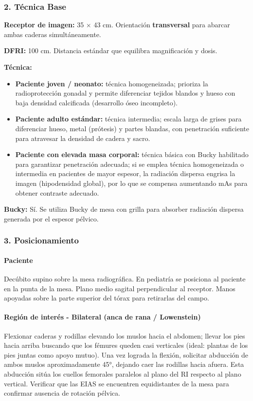 	\subsubsection*{2. Técnica Base}
	
	\textbf{Receptor de imagen:} 35 $\times$ 43 cm. Orientación \textbf{transversal} para abarcar ambas caderas simultáneamente.
	
	\textbf{DFRI:} 100 cm. Distancia estándar que equilibra magnificación y dosis.
	
	\textbf{Técnica:}
	\begin{itemize}
		\item \textbf{Paciente joven / neonato:} técnica homogeneizada; prioriza la radioprotección gonadal y permite diferenciar tejidos blandos y hueso con baja densidad calcificada (desarrollo óseo incompleto).
		\item \textbf{Paciente adulto estándar:} técnica intermedia; escala larga de grises para diferenciar hueso, metal (prótesis) y partes blandas, con penetración suficiente para atravesar la densidad de cadera y sacro.
		\item \textbf{Paciente con elevada masa corporal:} técnica básica con Bucky habilitado para garantizar penetración adecuada; si se emplea técnica homogeneizada o intermedia en pacientes de mayor espesor, la radiación dispersa engrisa la imagen (hipodensidad global), por lo que se compensa aumentando mAs para obtener contraste adecuado.
	\end{itemize}
	
	\textbf{Bucky:} Sí. Se utiliza Bucky de mesa con grilla para absorber radiación dispersa generada por el espesor pélvico.
	
	\subsubsection*{3. Posicionamiento}
	
	\paragraph{Paciente}
	Decúbito supino sobre la mesa radiográfica. En pediatría se posiciona al paciente en la punta de la mesa. Plano medio sagital perpendicular al receptor. Manos apoyadas sobre la parte superior del tórax para retirarlas del campo.
	
	\paragraph{Región de interés - Bilateral (anca de rana / Lowenstein)}
	Flexionar caderas y rodillas elevando los muslos hacia el abdomen; llevar los pies hacia arriba buscando que los fémures queden casi verticales (ideal: plantas de los pies juntas como apoyo mutuo). Una vez lograda la flexión, solicitar abducción de ambos muslos aproximadamente 45°, dejando caer las rodillas hacia afuera. Esta abducción sitúa los cuellos femorales paralelos al plano del RI respecto al plano vertical. Verificar que las EIAS se encuentren equidistantes de la mesa para confirmar ausencia de rotación pélvica.
	

